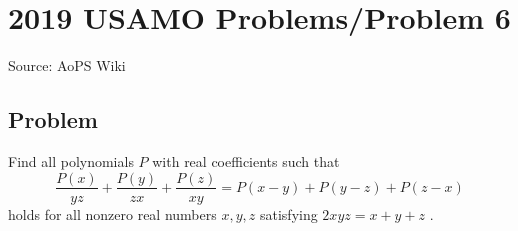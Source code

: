 \documentclass[12pt]{article}
\begin{document}
\section*{{2019 USAMO Problems/Problem 6}}
Source: AoPS Wiki

\subsection*{Problem}
Find all polynomials $P$ with real coefficients such that \[\frac{P(x)}{yz}+\frac{P(y)}{zx}+\frac{P(z)}{xy}=P(x-y)+P(y-z)+P(z-x)\] holds for all nonzero real numbers $x,y,z$ satisfying $2xyz=x+y+z$ .
\end{document}
